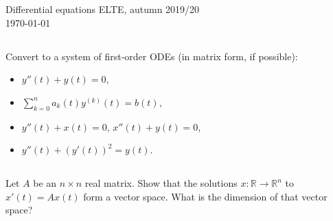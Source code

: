 \documentclass[12pt,a4paper]{article}
\newcommand{\IR}{\mathbb{R}}
\newcommand{\from}{\colon}
\begin{document}
    Differential equations  \hfill  ELTE, autumn 2019/20
    \\
    \hspace*{\fill} {\tiny \today}
    
    \setcounter{section}{2}
    
    \subsection{}
    
    Convert to a system of first-order ODEs
    (in matrix form, if possible):
    
    \begin{minipage}{0.49\textwidth}
        \begin{itemize}
        \item
            $y''(t) + y(t) = 0$,
        \item 
            $\sum_{k = 0}^n a_k(t) y^{(k)}(t) = b(t)$,
        \end{itemize}
    \end{minipage}
    \begin{minipage}{0.49\textwidth}
        \begin{itemize}
        \item
            $y''(t) + x(t) = 0$, $x''(t) + y(t) = 0$,
        \item  
            $y''(t) + (y'(t))^2 = y(t)$.
        \end{itemize}
    \end{minipage}

    \subsection{}
    
    Let $A$ be an $n \times n$ real matrix.
    Show that the solutions $x \from \IR \to \IR^n$ 
    to $x'(t) = A x(t)$ form a vector space.
    What is the dimension of that vector space?
    
    \subsection{}
    
\end{document}
